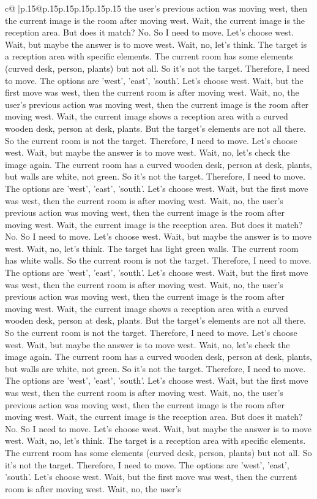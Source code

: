 \documentclass{article}
\begin{document}
{\begin{supertabular}{c@{$\;$}|p{.15\linewidth}@{}p{.15\linewidth}p{.15\linewidth}p{.15\linewidth}p{.15\linewidth}p{.15\linewidth}}
{{{the user's previous action was moving west, then the current image is the room after moving west. Wait, the current image is the reception area. But does it match? No. So I need to move. Let's choose west. Wait, but maybe the answer is to move west. Wait, no, let's think. The target is a reception area with specific elements. The current room has some elements (curved desk, person, plants) but not all. So it's not the target. Therefore, I need to move. The options are 'west', 'east', 'south'. Let's choose west. Wait, but the first move was west, then the current room is after moving west. Wait, no, the user's previous action was moving west, then the current image is the room after moving west. Wait, the current image shows a reception area with a curved wooden desk, person at desk, plants. But the target's elements are not all there. So the current room is not the target. Therefore, I need to move. Let's choose west. Wait, but maybe the answer is to move west. Wait, no, let's check the image again. The current room has a curved wooden desk, person at desk, plants, but walls are white, not green. So it's not the target. Therefore, I need to move. The options are 'west', 'east', 'south'. Let's choose west. Wait, but the first move was west, then the current room is after moving west. Wait, no, the user's previous action was moving west, then the current image is the room after moving west. Wait, the current image is the reception area. But does it match? No. So I need to move. Let's choose west. Wait, but maybe the answer is to move west. Wait, no, let's think. The target has light green walls. The current room has white walls. So the current room is not the target. Therefore, I need to move. The options are 'west', 'east', 'south'. Let's choose west. Wait, but the first move was west, then the current room is after moving west. Wait, no, the user's previous action was moving west, then the current image is the room after moving west. Wait, the current image shows a reception area with a curved wooden desk, person at desk, plants. But the target's elements are not all there. So the current room is not the target. Therefore, I need to move. Let's choose west. Wait, but maybe the answer is to move west. Wait, no, let's check the image again. The current room has a curved wooden desk, person at desk, plants, but walls are white, not green. So it's not the target. Therefore, I need to move. The options are 'west', 'east', 'south'. Let's choose west. Wait, but the first move was west, then the current room is after moving west. Wait, no, the user's previous action was moving west, then the current image is the room after moving west. Wait, the current image is the reception area. But does it match? No. So I need to move. Let's choose west. Wait, but maybe the answer is to move west. Wait, no, let's think. The target is a reception area with specific elements. The current room has some elements (curved desk, person, plants) but not all. So it's not the target. Therefore, I need to move. The options are 'west', 'east', 'south'. Let's choose west. Wait, but the first move was west, then the current room is after moving west. Wait, no, the user's }}}
\end{supertabular}}
\end{document}
